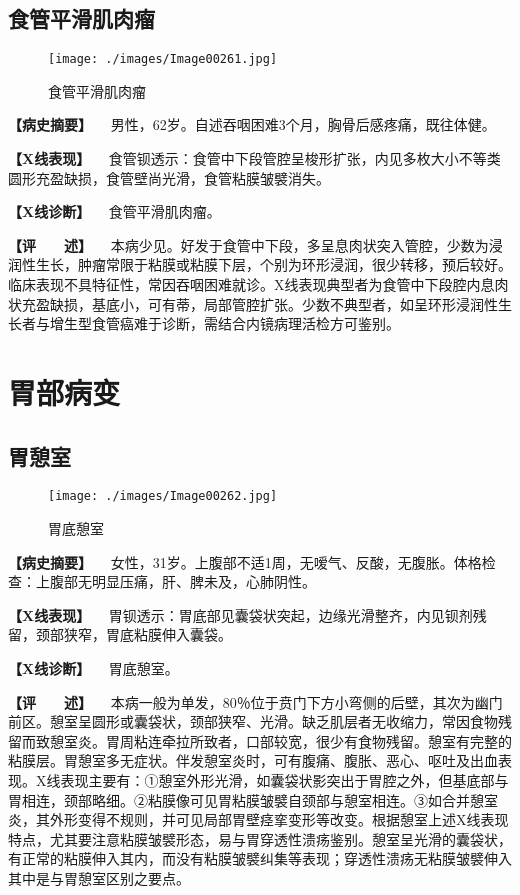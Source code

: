 \subsection{食管平滑肌肉瘤}

\begin{figure}[!htbp]
 \centering
 \texttt{[image: ./images/Image00261.jpg]}
 \captionsetup{justification=centering}
 \caption{食管平滑肌肉瘤}
 \label{fig5-2-18}
  \end{figure} 

\textbf{【病史摘要】}
　男性，62岁。自述吞咽困难3个月，胸骨后感疼痛，既往体健。

\textbf{【X线表现】}
　食管钡透示：食管中下段管腔呈梭形扩张，内见多枚大小不等类圆形充盈缺损，食管壁尚光滑，食管粘膜皱襞消失。

\textbf{【X线诊断】} 　食管平滑肌肉瘤。

\textbf{【评　　述】}
　本病少见。好发于食管中下段，多呈息肉状突入管腔，少数为浸润性生长，肿瘤常限于粘膜或粘膜下层，个别为环形浸润，很少转移，预后较好。临床表现不具特征性，常因吞咽困难就诊。X线表现典型者为食管中下段腔内息肉状充盈缺损，基底小，可有蒂，局部管腔扩张。少数不典型者，如呈环形浸润性生长者与增生型食管癌难于诊断，需结合内镜病理活检方可鉴别。

\section{胃部病变}

\subsection{胃憩室}

\begin{figure}[!htbp]
 \centering
 \texttt{[image: ./images/Image00262.jpg]}
 \captionsetup{justification=centering}
 \caption{胃底憩室}
 \label{fig5-3-1}
  \end{figure} 

\textbf{【病史摘要】}
　女性，31岁。上腹部不适1周，无嗳气、反酸，无腹胀。体格检查：上腹部无明显压痛，肝、脾未及，心肺阴性。

\textbf{【X线表现】}
　胃钡透示：胃底部见囊袋状突起，边缘光滑整齐，内见钡剂残留，颈部狭窄，胃底粘膜伸入囊袋。

\textbf{【X线诊断】} 　胃底憩室。

\textbf{【评　　述】}
　本病一般为单发，80％位于贲门下方小弯侧的后壁，其次为幽门前区。憩室呈圆形或囊袋状，颈部狭窄、光滑。缺乏肌层者无收缩力，常因食物残留而致憩室炎。胃周粘连牵拉所致者，口部较宽，很少有食物残留。憩室有完整的粘膜层。胃憩室多无症状。伴发憩室炎时，可有腹痛、腹胀、恶心、呕吐及出血表现。X线表现主要有：①憩室外形光滑，如囊袋状影突出于胃腔之外，但基底部与胃相连，颈部略细。②粘膜像可见胃粘膜皱襞自颈部与憩室相连。③如合并憩室炎，其外形变得不规则，并可见局部胃壁痉挛变形等改变。根据憩室上述X线表现特点，尤其要注意粘膜皱襞形态，易与胃穿透性溃疡鉴别。憩室呈光滑的囊袋状，有正常的粘膜伸入其内，而没有粘膜皱襞纠集等表现；穿透性溃疡无粘膜皱襞伸入其中是与胃憩室区别之要点。

